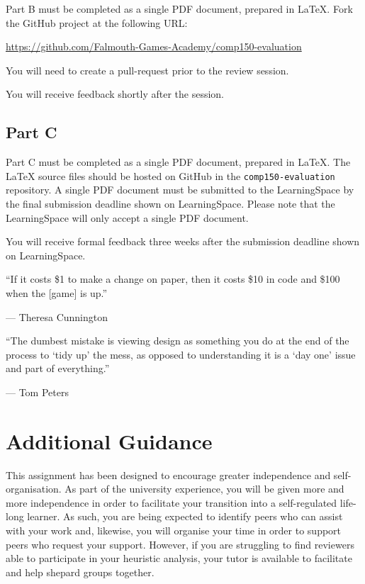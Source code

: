 \documentclass{../fal_assignment}
\begin{document}
Part B must be completed as a single PDF document, prepared in LaTeX.  Fork the GitHub project at the following URL:

\indent \url{https://github.com/Falmouth-Games-Academy/comp150-evaluation}

You will need to create a pull-request prior to the review session. 

You will receive feedback shortly after the session.

\subsection*{Part C}

Part C must be completed as a single PDF document, prepared in LaTeX. The LaTeX source files should be hosted on GitHub in the \texttt{comp150-evaluation} repository. A single PDF document must be submitted to the LearningSpace by the final submission deadline shown on LearningSpace. Please note that the LearningSpace will only accept a single PDF document.

You will receive formal feedback three weeks after the submission deadline shown on LearningSpace.

\begin{marginquote}
    ``If it costs \$1 to make a change on paper, then it costs \$10 in code and \$100 when the [game] is up.''
    
    --- Theresa Cunnington
    
        \marginquoterule
        
    ``The dumbest mistake is viewing design as something you do at the end of the process to `tidy up' the mess, as opposed to understanding it is a `day one' issue and part of everything.''
    
    --- Tom Peters 
\end{marginquote}
\section*{Additional Guidance}

This assignment has been designed to encourage greater independence and self-organisation. As part of the university experience, you will be given more and more independence in order to facilitate your transition into a self-regulated life-long learner. As such, you are being expected to identify peers who can assist with your work and, likewise, you will organise your time in order to support peers who request your support. However, if you are struggling to find reviewers able to participate in your heuristic analysis, your tutor is available to facilitate and help shepard groups together.
\end{document}
